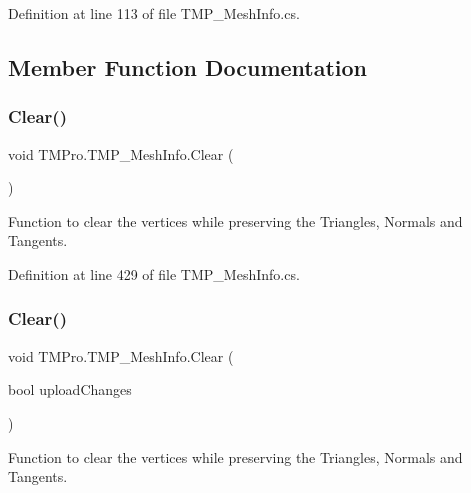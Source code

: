 Definition at line 113 of file T\+M\+P\+\_\+\+Mesh\+Info.\+cs.



\subsection{Member Function Documentation}
\mbox{\label{struct_t_m_pro_1_1_t_m_p___mesh_info_add2e199157007db54ca91226a7d8a3dc}} 
\subsubsection{\texorpdfstring{Clear()}{Clear()}\hspace{0.1cm}{\footnotesize\ttfamily [1/2]}}
{\footnotesize\ttfamily void T\+M\+Pro.\+T\+M\+P\+\_\+\+Mesh\+Info.\+Clear (\begin{DoxyParamCaption}{ }\end{DoxyParamCaption})}



Function to clear the vertices while preserving the Triangles, Normals and Tangents. 



Definition at line 429 of file T\+M\+P\+\_\+\+Mesh\+Info.\+cs.

\mbox{\label{struct_t_m_pro_1_1_t_m_p___mesh_info_ad1fe51b4a54d9707e40400ebcfae7dea}} 
\subsubsection{\texorpdfstring{Clear()}{Clear()}\hspace{0.1cm}{\footnotesize\ttfamily [2/2]}}
{\footnotesize\ttfamily void T\+M\+Pro.\+T\+M\+P\+\_\+\+Mesh\+Info.\+Clear (\begin{DoxyParamCaption}\item[{bool}]{upload\+Changes }\end{DoxyParamCaption})}



Function to clear the vertices while preserving the Triangles, Normals and Tangents. 



